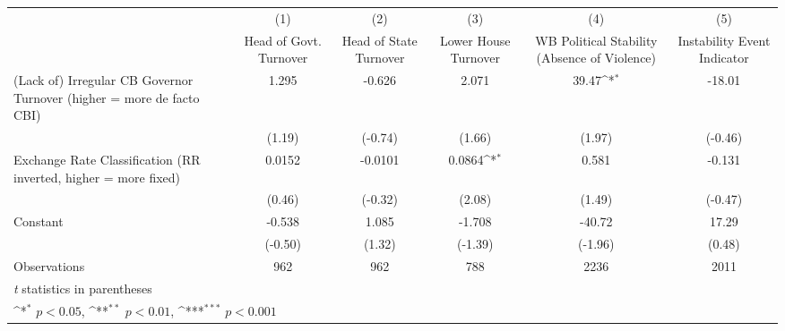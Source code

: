 {
\def\sym#1{\ifmmode^{#1}\else\(^{#1}\)\fi}
\begin{tabular*}{\linewidth}{@{\hskip\tabcolsep\extracolsep\fill}l*{5}{c}}
\hline\hline
                &\multicolumn{1}{c}{(1)}&\multicolumn{1}{c}{(2)}&\multicolumn{1}{c}{(3)}&\multicolumn{1}{c}{(4)}&\multicolumn{1}{c}{(5)}\\
                &\multicolumn{1}{c}{Head of Govt. Turnover}&\multicolumn{1}{c}{Head of State Turnover}&\multicolumn{1}{c}{Lower House Turnover}&\multicolumn{1}{c}{WB Political Stability (Absence of Violence)}&\multicolumn{1}{c}{Instability Event Indicator}\\
\hline
(Lack of) Irregular CB Governor Turnover (higher = more de facto CBI)&    1.295         &   -0.626         &    2.071         &    39.47\sym{*}  &   -18.01         \\
                &   (1.19)         &  (-0.74)         &   (1.66)         &   (1.97)         &  (-0.46)         \\
[1em]
Exchange Rate Classification (RR inverted, higher = more fixed)&   0.0152         &  -0.0101         &   0.0864\sym{*}  &    0.581         &   -0.131         \\
                &   (0.46)         &  (-0.32)         &   (2.08)         &   (1.49)         &  (-0.47)         \\
[1em]
Constant        &   -0.538         &    1.085         &   -1.708         &   -40.72         &    17.29         \\
                &  (-0.50)         &   (1.32)         &  (-1.39)         &  (-1.96)         &   (0.48)         \\
\hline
Observations    &      962         &      962         &      788         &     2236         &     2011         \\
\hline\hline
\multicolumn{6}{l}{\footnotesize \textit{t} statistics in parentheses}\\
\multicolumn{6}{l}{\footnotesize \sym{*} \(p<0.05\), \sym{**} \(p<0.01\), \sym{***} \(p<0.001\)}\\
\end{tabular*}
}

